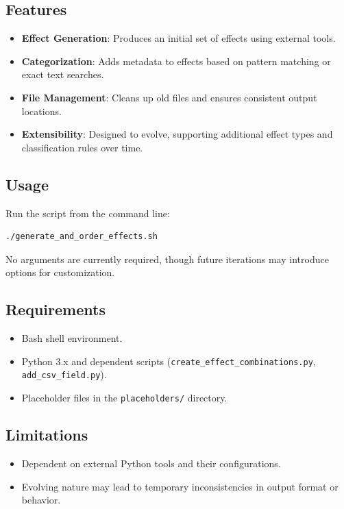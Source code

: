 \subsection{Features}
\begin{itemize}
    \item \textbf{Effect Generation}: Produces an initial set of effects using external tools.
    \item \textbf{Categorization}: Adds metadata to effects based on pattern matching or exact text searches.
    \item \textbf{File Management}: Cleans up old files and ensures consistent output locations.
    \item \textbf{Extensibility}: Designed to evolve, supporting additional effect types and classification rules over time.
\end{itemize}

\subsection{Usage}
Run the script from the command line:
\begin{lstlisting}[style=terminalstyle]
./generate_and_order_effects.sh
\end{lstlisting}
No arguments are currently required, though future iterations may introduce options for customization.

\subsection{Requirements}
\begin{itemize}
    \item Bash shell environment.
    \item Python 3.x and dependent scripts (\texttt{create\_effect\_combinations.py}, \texttt{add\_csv\_field.py}).
    \item Placeholder files in the \texttt{placeholders/} directory.
\end{itemize}

\subsection{Limitations}
\begin{itemize}
    \item Dependent on external Python tools and their configurations.
    \item Evolving nature may lead to temporary inconsistencies in output format or behavior.
\end{itemize}











